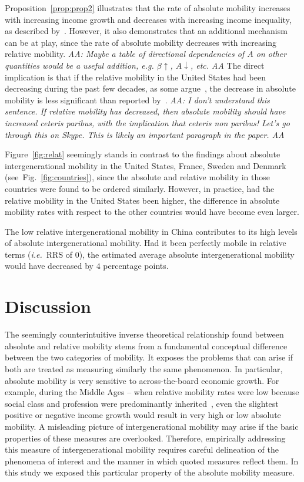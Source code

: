 \documentclass[12pt,a4paper]{article}
\newcommand{\red}[1]{{\color{red} #1}}
\newcommand{\Pref}[1]{Proposition~\ref{prop:#1}}
\newcommand{\ie}{{\it i.e.}\ }
\newcommand{\AAA}[1]{\red{{\it AA: #1 AA}}}
\newcommand{\fref}[1]{Fig.~\ref{fig:#1}}
\newcommand{\Fref}[1]{Figure~\ref{fig:#1}}
\numberwithin{equation}{section}
\begin{document}
\Pref{prop2} illustrates that the rate of absolute mobility increases with increasing income growth and decreases with increasing income inequality, as described by~\citet{chetty2017fading}. However, it also demonstrates that an additional mechanism can be at play, since the rate of absolute mobility decreases with increasing relative mobility. \AAA{Maybe a table of directional dependencies of $A$ on other quantities would be a useful addition, e.g. $\beta\uparrow$, $A\downarrow$, etc.} The direct implication is that if the relative mobility in the United States had been decreasing during the past few decades, as some argue~\citep{aaronson2008intergenerational,putnam2012growing}, the decrease in absolute mobility is less significant than reported by~\citet{chetty2017fading}. \AAA{I don't understand this sentence. If relative mobility has decreased, then absolute mobility should have increased ceteris paribus, with the implication that ceteris non paribus! Let's go through this on Skype. This is likely an important paragraph in the paper.}

\Fref{relat} seemingly stands in contrast to the findings about absolute intergenerational mobility in the United States, France, Sweden and Denmark (see~\fref{countries}), since the absolute and relative mobility in those countries were found to be ordered similarly. However, in practice, had the relative mobility in the United States been higher, the difference in absolute mobility rates with respect to the other countries would have become even larger.

The low relative intergenerational mobility in China contributes to its high levels of absolute intergenerational mobility. Had it been perfectly mobile in relative terms (\ie RRS of $0$), the estimated average absolute intergenerational mobility would have decreased by $4$ percentage points.

\section{Discussion}

The seemingly counterintuitive inverse theoretical relationship found between absolute and relative mobility stems from a fundamental conceptual difference between the two categories of mobility. It exposes the problems that can arise if both are treated as measuring similarly the same phenomenon. In particular, absolute mobility is very sensitive to across-the-board economic growth. For example, during the Middle Ages -- when relative mobility rates were low because social class and profession were predominantly inherited~\citep{goldthorpe1982social,clark2014also}, even the slightest positive or negative income growth would result in very high or low absolute mobility. A misleading picture of intergenerational mobility may arise if the basic properties of these measures are overlooked. Therefore, empirically addressing this measure of intergenerational mobility requires careful delineation of the phenomena of interest and the manner in which quoted measures reflect them. In this study we exposed this particular property of the absolute mobility measure.
\end{document}
